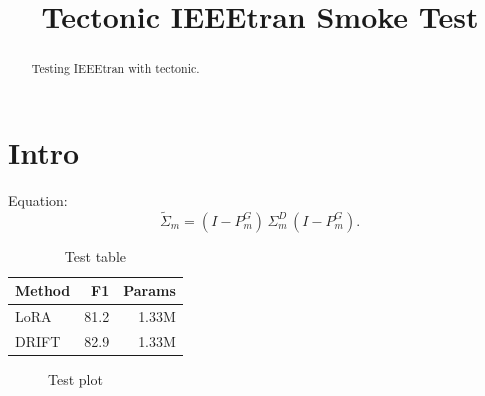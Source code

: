 \documentclass[conference]{IEEEtran}
\begin{document}
\title{Tectonic IEEEtran Smoke Test}
\author{}
\maketitle
\begin{abstract}
Testing IEEEtran with tectonic.
\end{abstract}
\section{Intro}
Equation:
\begin{equation}
\widetilde{\Sigma}_m = (I - P^{G}_m)\,\Sigma^{D}_m\,(I - P^{G}_m).
\end{equation}
\begin{table}[t]
\centering
\caption{Test table}
\begin{tabular}{lrr}
\toprule
Method & F1 & Params \\
\midrule
LoRA & 81.2 & 1.33M \\
DRIFT & 82.9 & 1.33M \\
\bottomrule
\end{tabular}
\end{table}

\begin{figure}[t]
\centering
{}
\caption{Test plot}
\end{figure}
\end{document}
